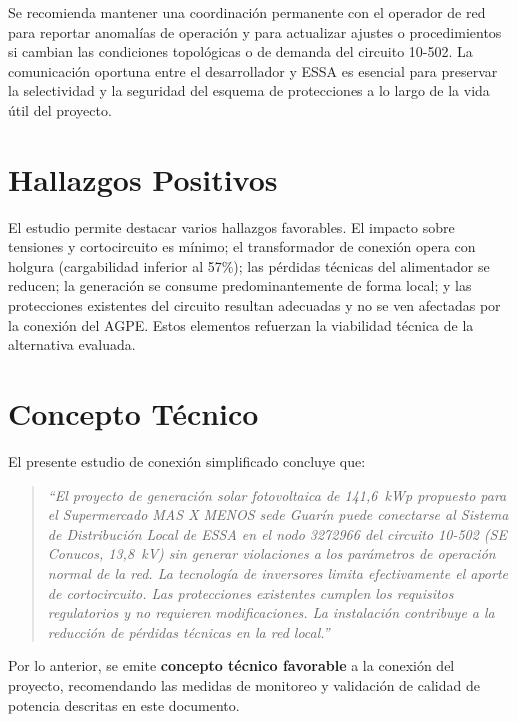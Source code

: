 Se recomienda mantener una coordinación permanente con el operador de red para reportar anomalías de operación y para actualizar ajustes o procedimientos si cambian las condiciones topológicas o de demanda del circuito 10-502. La comunicación oportuna entre el desarrollador y ESSA es esencial para preservar la selectividad y la seguridad del esquema de protecciones a lo largo de la vida útil del proyecto.

\section{Hallazgos Positivos}

El estudio permite destacar varios hallazgos favorables. El impacto sobre tensiones y cortocircuito es mínimo; el transformador de conexión opera con holgura (cargabilidad inferior al 57\%); las pérdidas técnicas del alimentador se reducen; la generación se consume predominantemente de forma local; y las protecciones existentes del circuito resultan adecuadas y no se ven afectadas por la conexión del AGPE. Estos elementos refuerzan la viabilidad técnica de la alternativa evaluada.

\section{Concepto Técnico}

El presente estudio de conexión simplificado concluye que:

\begin{quote}
\textit{``El proyecto de generación solar fotovoltaica de 141,6~kWp propuesto para el Supermercado MAS X MENOS sede Guarín puede conectarse al Sistema de Distribución Local de ESSA en el nodo 3272966 del circuito 10-502 (SE Conucos, 13,8~kV) sin generar violaciones a los parámetros de operación normal de la red. La tecnología de inversores limita efectivamente el aporte de cortocircuito. Las protecciones existentes cumplen los requisitos regulatorios y no requieren modificaciones. La instalación contribuye a la reducción de pérdidas técnicas en la red local.''}
\end{quote}

Por lo anterior, se emite \textbf{concepto técnico favorable} a la conexión del proyecto, recomendando las medidas de monitoreo y validación de calidad de potencia descritas en este documento.
